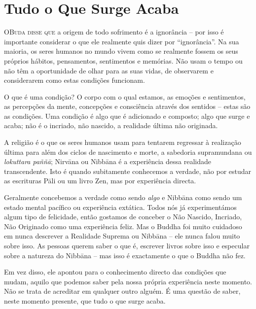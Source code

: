 \chapter{Tudo o Que Surge Acaba}

\lettrine{O}{\space Buda disse que} a origem de todo sofrimento é a ignorância -- por isso é
importante considerar o que ele realmente quis dizer por ``ignorância''. Na sua
maioria, os seres humanos no mundo vivem como se realmente fossem os seus
próprios hábitos, pensamentos, sentimentos e memórias. Não usam o tempo ou não
têm a oportunidade de olhar para as suas vidas, de observarem e considerarem
como estas condições funcionam.

O que é uma condição? O corpo com o qual estamos, as emoções e sentimentos, as
percepções da mente, concepções e consciência através dos sentidos -- estas são
as condições. Uma condição é algo que é adicionado e composto; algo que surge e
acaba; não é o incriado, não nascido, a realidade última não originada.

A religião é o que os seres humanos usam para tentarem regressar à realização
última para além dos ciclos de nascimento e morte, a sabedoria supramundana ou
\emph{lokuttara paññā}; Nirvāna ou Nibbāna é a experiência dessa
realidade transcendente. Isto é quando subitamente conhecemos a verdade, não por
estudar as escrituras Pāli ou um livro Zen, mas por experiência directa.

Geralmente concebemos a verdade como sendo \emph{algo} e Nibbāna como
sendo um estado mental pacífico ou experiência extática. Todos nós já
experimentámos algum tipo de felicidade, então gostamos de conceber o Não
Nascido, Incriado, Não Originado como uma experiência feliz. Mas o Buddha foi
muito cuidadoso em nunca descrever a Realidade Suprema ou Nibbāna -- ele
nunca falou muito sobre isso. As pessoas querem saber o que é, escrever livros
sobre isso e especular sobre a natureza do Nibbāna -- mas isso é
exactamente o que o Buddha não fez.

Em vez disso, ele apontou para o conhecimento directo das condições que mudam,
aquilo que podemos saber pela nossa própria experiência neste momento. Não se
trata de acreditar em qualquer outro alguém. É uma questão de saber, neste
momento presente, que tudo o que surge acaba.

